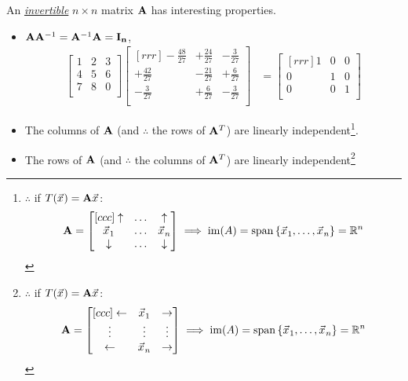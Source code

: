 \documentclass{article}%
\begin{document}
\begin{multicols}{2}
An {\em \href{https://en.wikipedia.org/wiki/Invertible_matrix}{invertible}} $n \times n$ matrix $\mathbf{A}$ has interesting properties.
\begin{itemize}
\item $\mathbf{A}\mathbf{A}^{-1} = \mathbf{A}^{-1}\mathbf{A} = \mathbf{I_{n}}$, \eg
\begin{align}
 \begin{bmatrix} 1& 2& 3\\ 4& 5& 6\\ 7& 8& 0\\ \end{bmatrix} \begin{bmatrix}[rrr]
-\frac{48}{27}& +\frac{24}{27}& -\frac{3}{27}\\ +\frac{42}{27}& -\frac{21}{27}& +\frac{6}{27}\\ -\frac{3}{27}& +\frac{6}{27}& -\frac{3}{27}\\
\end{bmatrix} &=\begin{bmatrix}[rrr] 1& 0& 0\\ 0& 1& 0\\ 0& 0& 1\\\end{bmatrix}
\end{align}
  \item The columns of $\mathbf{A}$ (and $\therefore$ the rows of $\mathbf{A}^T$) are linearly independent\footnote{$\therefore$ if $T(\vecx) = \matA\vecx$:
\begin{align}
  \matA = \begin{bmatrix}[ccc] \uparrow&\dots&\uparrow \\ \vecx_1&\dots&\vecx_n \\ \downarrow&\dots&\downarrow \\ \end{bmatrix} \implies \imag(A) = \spn\left\{ \vecx_1,\dots,\vecx_n \right\} = \RN
\end{align}}.
  \item The rows of $\mathbf{A}$ (and $\therefore$ the columns of $\mathbf{A}^T$) are linearly independent\footnote{$\therefore$ if $T(\vecx) = \matA\vecx$:
\begin{align}
  \matA = \begin{bmatrix}[ccc] \leftarrow&\vecx_1&\rightarrow \\ \vdots&\vdots&\vdots \\ \leftarrow&\vecx_n&\rightarrow \\ \end{bmatrix} \implies \imag(A) = \spn\left\{ \vecx_1,\dots,\vecx_n \right\} = \RN

\end{align}}
\end{itemize}
\end{multicols}
\end{document}
